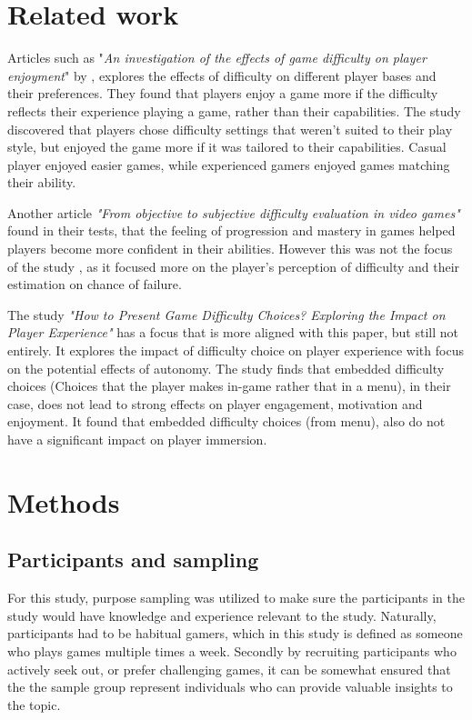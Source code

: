 \section{Related work}

Articles such as "\textit{An investigation of the effects of game difficulty on player enjoyment}" by \cite{justin_t_alexander_investigation_2025}, explores the effects of difficulty on different player bases and their preferences. They found that players enjoy a game more if the difficulty reflects their experience playing a game, rather than their capabilities. The study discovered that players chose difficulty settings that weren't suited to their play style, but enjoyed the game more if it was tailored to their capabilities. Casual player enjoyed easier games, while experienced gamers enjoyed games matching their ability.

Another article \textit{"From objective to subjective difficulty evaluation in video games"}\cite{constant_objective_2017} found in their tests, that the feeling of progression and mastery in games helped players become more confident in their abilities. However this was not the focus of the study \cite{constant_objective_2017}, as it focused more on the player's perception of difficulty and their estimation on chance of failure. 

The study \textit{"How to Present Game Difficulty Choices? Exploring the Impact on Player Experience"} \cite{jan_d_smeddinck_how_2016} has a focus that is more aligned with this paper, but still not entirely. It explores the impact of difficulty choice on player experience with focus on the potential effects of autonomy. The study finds that embedded difficulty choices (Choices that the player makes in-game rather that in a menu), in their case, does not lead to strong effects on player engagement, motivation and enjoyment. It found that embedded difficulty choices (from menu), also do not have a significant impact on player immersion. 

\section{Methods}

\subsection{Participants and sampling}
For this study, purpose sampling was utilized to make sure the participants in the study would have knowledge and experience relevant to the study. Naturally, participants had to be habitual gamers, which in this study is defined as someone who plays games multiple times a week. Secondly by recruiting participants who actively seek out, or prefer challenging games, it can be somewhat ensured that the the sample group represent individuals who can provide valuable insights to the topic.

